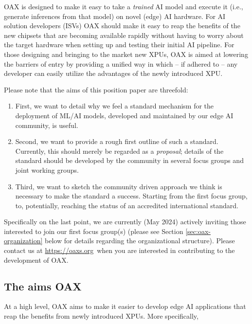 \documentclass{article}
\newcommand{\oaxweb}{\href{https://oaxs.org}{https://oaxs.org}}
\begin{document}
OAX is designed to make it easy to take a \emph{trained} AI model and execute it (i.e., generate inferences from that model) on novel (edge) AI hardware. For AI solution developers (ISVs) OAX should make it easy to reap the benefits of the new chipsets that are becoming available rapidly without having to worry about the target hardware when setting up and testing their initial AI pipeline. For those designing and bringing to the market new XPUs, OAX is aimed at lowering the barriers of entry by providing a unified way in which -- if adhered to -- any developer can easily utilize the advantages of the newly introduced XPU. 

Please note that the aims of this position paper are threefold:
\begin{enumerate}
\item First, we want to detail why we feel a standard mechanism for the deployment of ML/AI models, developed and maintained by our edge AI community, is useful.
\item Second, we want to provide a rough first outline of such a standard. Currently, this should merely be regarded as a \emph{proposal}; details of the standard should be developed by the community in several focus groups and joint working groups.
\item Third, we want to sketch the community driven approach we think is necessary to make the standard a success. Starting from the first focus group, to, potentially, reaching the status of an accredited international standard.
\end{enumerate}
Specifically on the last point, we are currently (May 2024) actively inviting those interested to join our first focus group(s) (please see Section \ref{sec:oax-organization} below for details regarding the organizational structure). Please contact us at \oaxweb ~when you are interested in contributing to the development of OAX.

\subsection{The aims OAX}

At a high level, OAX aims to make it easier to develop edge AI applications that reap the benefits from newly introduced XPUs. More specifically, 
\end{document}
